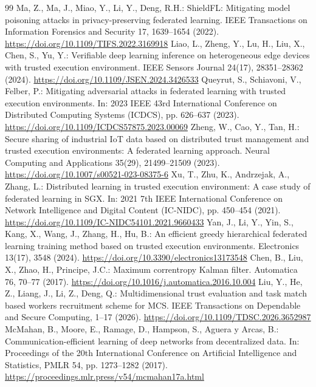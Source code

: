 \documentclass[runningheads,orivec]{llncs}
\begin{document}
\begin{thebibliography}{99}
     Ma, Z., Ma, J., Miao, Y., Li, Y., Deng, R.H.: ShieldFL: Mitigating model poisoning attacks in privacy-preserving federated learning. IEEE Transactions on Information Forensics and Security 17, 1639--1654 (2022). \url{https://doi.org/10.1109/TIFS.2022.3169918}
     Liao, L., Zheng, Y., Lu, H., Liu, X., Chen, S., Yu, Y.: Verifiable deep learning inference on heterogeneous edge devices with trusted execution environment. IEEE Sensors Journal 24(17), 28351--28362 (2024). \url{https://doi.org/10.1109/JSEN.2024.3426533}
     Queyrut, S., Schiavoni, V., Felber, P.: Mitigating adversarial attacks in federated learning with trusted execution environments. In: 2023 IEEE 43rd International Conference on Distributed Computing Systems (ICDCS), pp. 626--637 (2023). \url{https://doi.org/10.1109/ICDCS57875.2023.00069}
     Zheng, W., Cao, Y., Tan, H.: Secure sharing of industrial IoT data based on distributed trust management and trusted execution environments: A federated learning approach. Neural Computing and Applications 35(29), 21499--21509 (2023). \url{https://doi.org/10.1007/s00521-023-08375-6}
     Xu, T., Zhu, K., Andrzejak, A., Zhang, L.: Distributed learning in trusted execution environment: A case study of federated learning in SGX. In: 2021 7th IEEE International Conference on Network Intelligence and Digital Content (IC-NIDC), pp. 450--454 (2021). \url{https://doi.org/10.1109/IC-NIDC54101.2021.9660433}
     Yan, J., Li, Y., Yin, S., Kang, X., Wang, J., Zhang, H., Hu, B.: An efficient greedy hierarchical federated learning training method based on trusted execution environments. Electronics 13(17), 3548 (2024). \url{https://doi.org/10.3390/electronics13173548}
     Chen, B., Liu, X., Zhao, H., Principe, J.C.: Maximum correntropy Kalman filter. Automatica 76, 70--77 (2017). \url{https://doi.org/10.1016/j.automatica.2016.10.004}
     Liu, Y., He, Z., Liang, J., Li, Z., Deng, Q.: Multidimensional trust evaluation and task match based workers recruitment scheme for MCS. IEEE Transactions on Dependable and Secure Computing, 1--17 (2026). \url{https://doi.org/10.1109/TDSC.2026.3652987}
     McMahan, B., Moore, E., Ramage, D., Hampson, S., Aguera y Arcas, B.: Communication-efficient learning of deep networks from decentralized data. In: Proceedings of the 20th International Conference on Artificial Intelligence and Statistics, PMLR 54, pp. 1273--1282 (2017). \url{https://proceedings.mlr.press/v54/mcmahan17a.html}

\end{thebibliography}
\end{document}
